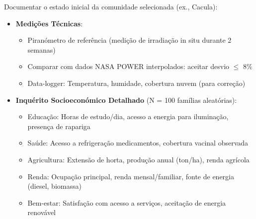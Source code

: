 \documentclass[12pt, a4paper]{article}
\begin{document}
{{{{{{{{{{{{Documentar o estado inicial da comunidade selecionada (ex., Cacula):

\begin{itemize}
\item \textbf{Medições Técnicas}:
  \begin{itemize}
  \item Piranómetro de referência (medição de irradiação in situ durante 2 semanas)
  \item Comparar com dados NASA POWER interpolados: aceitar desvio \(\leq\) 8\%
  \item Data-logger: Temperatura, humidade, cobertura nuvem (para correção)
  \end{itemize}

\item \textbf{Inquérito Socioeconómico Detalhado} (N = 100 famílias aleatórias):
  \begin{itemize}
  \item Educação: Horas de estudo/dia, acesso a energia para iluminação, presença de rapariga
  \item Saúde: Acesso a refrigeração medicamentos, cobertura vacinal observada
  \item Agricultura: Extensão de horta, produção anual (ton/ha), renda agrícola
  \item Renda: Ocupação principal, renda mensal/familiar, fonte de energia (diesel, biomassa)
  \item Bem-estar: Satisfação com acesso a serviços, aceitação de energia renovável
  \end{itemize}


\end{itemize}}}}}}}}}}}}}
\end{document}

